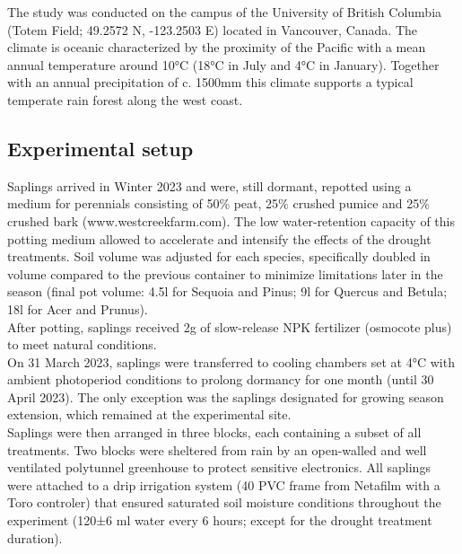 \documentclass{article}
\begin{document}
	
	The study was conducted on the campus of the University of British Columbia (Totem Field; 49.2572 N, -123.2503 E) located in Vancouver, Canada. The climate is oceanic characterized by the proximity of the Pacific with a mean annual temperature around 10°C (18°C in July and 4°C in January). Together with an annual precipitation of c. 1500mm this climate supports a typical temperate rain forest along the west coast. %
	
	\subsection*{Experimental setup}
		
	Saplings arrived in Winter 2023 and were, still dormant, repotted using a medium for perennials consisting of 50\% peat, 25\% crushed pumice and 25\% crushed bark (www.westcreekfarm.com). The low water-retention capacity of this potting medium allowed to accelerate and intensify the effects of the drought treatments. Soil volume was adjusted for each species, specifically doubled in volume compared to the previous container to minimize limitations later in the season (final pot volume: 4.5l for Sequoia and Pinus; 9l for Quercus and Betula; 18l for Acer and Prunus). \\ 
	After potting, saplings received 2g of slow-release NPK fertilizer (osmocote plus) to meet natural conditions. \\ 
	On 31 March 2023, saplings were transferred to cooling chambers set at 4°C with ambient photoperiod conditions to prolong dormancy for one month (until 30 April 2023). The only exception was the saplings designated for growing season extension, which remained at the experimental site. \\ 
	Saplings were then arranged in three blocks, each containing a subset of all treatments. Two blocks were sheltered from rain by an open-walled and well ventilated polytunnel greenhouse to protect sensitive electronics. All saplings were attached to a drip irrigation system (40 PVC frame from Netafilm with a Toro controler) that ensured saturated soil moisture conditions throughout the experiment (120±6 ml water every 6 hours;  except for the drought treatment duration). \\ 
	
\end{document}
